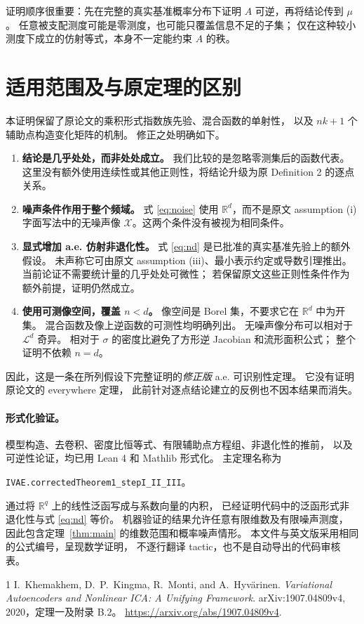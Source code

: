 \documentclass[UTF8,fontset=fandol,11pt,a4paper]{ctexart}
\theoremstyle{definition}
\newcommand{\R}{\mathbb R}
\newcommand{\Xset}{\mathcal X}
\newcommand{\Leb}{\mathcal L}
\begin{document}
证明顺序很重要：先在完整的真实基准概率分布下证明 $A$ 可逆，再将结论传到 $\mu$。
任意被支配测度可能是零测度，也可能只覆盖信息不足的子集；
仅在这种较小测度下成立的仿射等式，本身不一定能约束 $A$ 的秩。

\section{适用范围及与原定理的区别}

本证明保留了原论文的乘积形式指数族先验、混合函数的单射性，
以及 $nk+1$ 个辅助点构造变化矩阵的机制。
修正之处明确如下。
\begin{enumerate}[leftmargin=*,itemsep=4pt]
\item \textbf{结论是几乎处处，而非处处成立。}
我们比较的是忽略零测集后的函数代表。
这里没有额外使用连续性或其他正则性，将结论升级为原 Definition 2 的逐点关系。

\item \textbf{噪声条件作用于整个频域。}
式 \eqref{eq:noise} 使用 $\R^d$，而不是原文 assumption (i)
字面写法中的无噪声像 $\Xset$。这两个条件没有被视为相同条件。

\item \textbf{显式增加 a.e. 仿射非退化性。}
式 \eqref{eq:nd} 是已批准的真实基准先验上的额外假设。
未声称它可由原文 assumption (iii)、最小表示约定或导数引理推出。
当前论证不需要统计量的几乎处处可微性；
若保留原文这些正则性条件作为额外前提，证明仍然成立。

\item \textbf{使用可测像空间，覆盖 $n<d$。}
像空间是 Borel 集，不要求它在 $\R^d$ 中为开集。
混合函数及像上逆函数的可测性均明确列出。
无噪声像分布可以相对于 $\Leb^d$ 奇异。
相对于 $\sigma$ 的密度比避免了方形逆 Jacobian 和流形面积公式；
整个证明不依赖 $n=d$。
\end{enumerate}
因此，这是一条在所列假设下完整证明的\emph{修正版} a.e. 可识别性定理。
它没有证明原论文的 everywhere 定理，
此前针对逐点结论建立的反例也不因本结果而消失。

\paragraph{形式化验证。}
模型构造、去卷积、密度比恒等式、有限辅助点方程组、非退化性的推前，
以及可逆性论证，均已用 Lean 4 和 Mathlib 形式化。
主定理名称为
\begin{center}
\texttt{IVAE.correctedTheorem1\_stepI\_II\_III}。
\end{center}
通过将 $\R^q$ 上的线性泛函写成与系数向量的内积，
已经证明代码中的泛函形式非退化性与式 \eqref{eq:nd} 等价。
机器验证的结果允许任意有限维数及有限噪声测度，
因此包含定理~\ref{thm:main} 的维数范围和概率噪声情形。
本文件与英文版采用相同的公式编号，呈现数学证明，
不逐行翻译 tactic，也不是自动导出的代码审核表。

\begin{thebibliography}{1}
I.~Khemakhem, D.~P.~Kingma, R.~Monti, and A.~Hyv\"arinen.
\emph{Variational Autoencoders and Nonlinear ICA: A Unifying Framework}.
arXiv:1907.04809v4, 2020，定理一及附录 B.2。
\url{https://arxiv.org/abs/1907.04809v4}.
\end{thebibliography}
\end{document}
